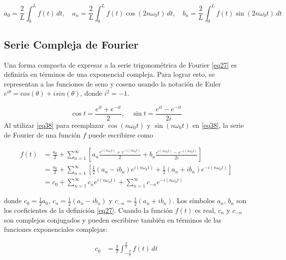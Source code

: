 \begin{equation}\label{eq37}
	a_0 = \frac{2}{L} \int_{0}^{L} f(t) \, dt, \quad a_n = \frac{2}{L} \int_{0}^{L} f(t) \cos(2n\omega_0 t) \, dt, \quad b_n = \frac{2}{L} \int_{0}^{L} f(t) \sin(2n\omega_0 t) \, dt
\end{equation}

\subsection{Serie Compleja de Fourier}
Una forma compacta de expresar a la serie trigonométrica de Fourier \eqref{eq27} es definiría en términos de una exponencial compleja. Para lograr esto, se representan a las funciones de seno y coseno usando la notación de Euler $e^{i\theta} = cos(\theta) + isin(\theta)$, donde $i^{2} = -1$. ~\cite{youtubeComplexFourier}

\begin{equation}\label{eq38}
	\cos t = \frac{e^{it} + e^{-it}}{2}, \quad \sin t = \frac{e^{it} - e^{-it}}{2i}
\end{equation}
Al utilizar \eqref{eq38} para reemplazar $\cos \left(n\omega_0 t\right)$ y $\sin \left(n\omega_0 t\right)$ en \eqref{eq38}, la serie de Fourier de una función $f$ puede escribirse como

\begin{equation} \label{eq39}
	\begin{split}
		f(t) &= \frac{a_0}{2} + \sum_{n=1}^{\infty} \left[a_n \frac{e^{i(n\omega_0 t)} + e^{-i(n\omega_0 t)}}{2} + b_n \frac{e^{i(n\omega_0 t)} - e^{-i(n\omega_0 t)}}{2i}\right] \\
		&= \frac{a_0}{2} + \sum_{n=1}^{\infty} \left[\frac{1}{2} \left(a_n - i b_n\right) e^{i (n\omega_0 t)} + \frac{1}{2} \left(a_n + i b_n\right) e^{-i (n\omega_0 t)}\right] \\
		&= c_0 + \sum_{n=1}^{\infty} c_n e^{i (n\omega_0 t)} + \sum_{n=1}^{\infty} c_{-n} e^{-i(n\omega_0 t)}
	\end{split}
\end{equation}


donde $c_0 = \frac{1}{2} a_0$, $c_n = \frac{1}{2} (a_n - i b_n)$ y $c_{-n} = \frac{1}{2} (a_n + i b_n)$. Los símbolos $a_n$, $b_n$ son los coeficientes de la definición \eqref{eq27}. Cuando la función $f(t)$ es real, $c_n$ y $c_{-n}$ son complejos conjugados y pueden escribirse también en términos de las funciones exponenciales complejas:

\begin{equation} \label{eq40}
	\begin{split}
		c_0 &= \frac{2}{T} \int_{-\frac{T}{2}}^{\frac{T}{2}} f(t) \, dt \\
	\end{split}
\end{equation}

